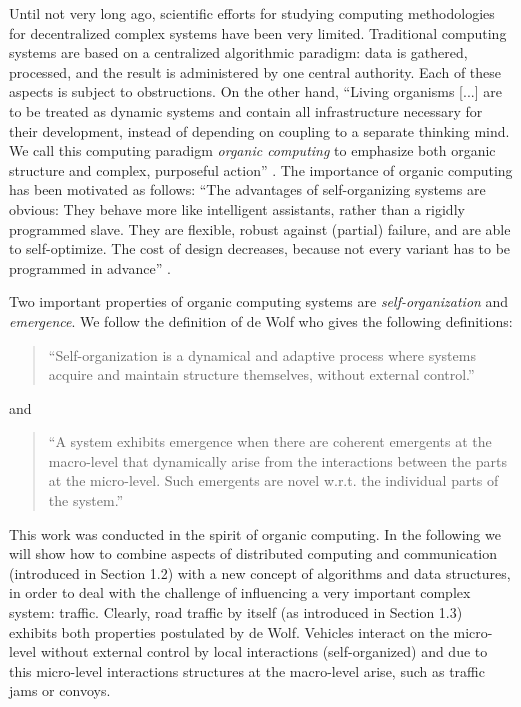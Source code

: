 \documentclass{acmrip}
\begin{document}
Until not very long ago, scientific efforts for studying computing methodologies
for decentralized complex systems have been very limited.  Traditional
computing systems are based on a centralized algorithmic paradigm: data is
gathered, processed, and the result is administered by one central authority.
Each of these aspects is subject to obstructions. On the other hand, ``Living
organisms [...] are to be treated as dynamic systems and contain all
infrastructure necessary for their development, instead of depending on
coupling to a separate thinking mind. We call this computing paradigm {\em
organic computing} to emphasize both organic structure and complex, purposeful
action'' \cite{org}.  The importance of organic computing has been motivated as
follows: ``The advantages of self-organizing systems are obvious: They behave
more like intelligent assistants, rather than a rigidly programmed slave. They
are flexible, robust against (partial) failure, and are able to self-optimize.
The cost of design decreases, because not every variant has to be programmed in
advance'' \cite{msu-ocpfp-04}.

Two important properties of organic computing systems are {\em
self-organization} and {\em emergence}. We follow the definition of de Wolf
\cite{wolf05} who gives the following definitions:
\begin{quote}
``Self-organization is a dynamical and adaptive process where systems acquire
and maintain structure themselves, without external control.''
\end{quote}
and
\begin{quote}
``A system exhibits emergence when there are coherent emergents at the
macro-level that dynamically arise from the interactions between the parts
at the micro-level. Such emergents are novel w.r.t. the individual parts of
the system.''
\end{quote}

This work was conducted in the spirit of organic computing. In the following we
will show how to combine aspects of distributed computing and communication (introduced in Section 1.2)
with a new concept of algorithms and data structures, in order to deal with the
challenge of influencing a very important complex system: traffic.  Clearly,
road traffic by itself (as introduced in Section 1.3) exhibits both properties postulated by de Wolf. Vehicles
interact on the micro-level without external control by local interactions
(self-organized) and due to this micro-level interactions structures at the
macro-level arise, such as traffic jams or convoys.
\end{document}
